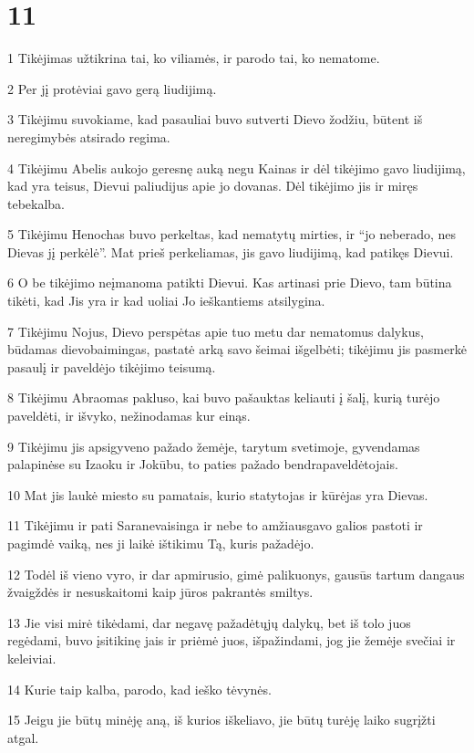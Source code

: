 \chapter{11}


\par 1 Tikėjimas užtikrina tai, ko viliamės, ir parodo tai, ko nematome. 
\par 2 Per jį protėviai gavo gerą liudijimą. 
\par 3 Tikėjimu suvokiame, kad pasauliai buvo sutverti Dievo žodžiu, būtent iš neregimybės atsirado regima. 
\par 4 Tikėjimu Abelis aukojo geresnę auką negu Kainas ir dėl tikėjimo gavo liudijimą, kad yra teisus, Dievui paliudijus apie jo dovanas. Dėl tikėjimo jis ir miręs tebekalba. 
\par 5 Tikėjimu Henochas buvo perkeltas, kad nematytų mirties, ir “jo neberado, nes Dievas jį perkėlė”. Mat prieš perkeliamas, jis gavo liudijimą, kad patikęs Dievui. 
\par 6 O be tikėjimo neįmanoma patikti Dievui. Kas artinasi prie Dievo, tam būtina tikėti, kad Jis yra ir kad uoliai Jo ieškantiems atsilygina. 
\par 7 Tikėjimu Nojus, Dievo perspėtas apie tuo metu dar nematomus dalykus, būdamas dievobaimingas, pastatė arką savo šeimai išgelbėti; tikėjimu jis pasmerkė pasaulį ir paveldėjo tikėjimo teisumą. 
\par 8 Tikėjimu Abraomas pakluso, kai buvo pašauktas keliauti į šalį, kurią turėjo paveldėti, ir išvyko, nežinodamas kur einąs. 
\par 9 Tikėjimu jis apsigyveno pažado žemėje, tarytum svetimoje, gyvendamas palapinėse su Izaoku ir Jokūbu, to paties pažado bendrapaveldėtojais. 
\par 10 Mat jis laukė miesto su pamatais, kurio statytojas ir kūrėjas yra Dievas. 
\par 11 Tikėjimu ir pati Sara­nevaisinga ir nebe to amžiaus­gavo galios pastoti ir pagimdė vaiką, nes ji laikė ištikimu Tą, kuris pažadėjo. 
\par 12 Todėl iš vieno vyro, ir dar apmirusio, gimė palikuonys, gausūs tartum dangaus žvaigždės ir nesuskaitomi kaip jūros pakrantės smiltys. 
\par 13 Jie visi mirė tikėdami, dar negavę pažadėtųjų dalykų, bet iš tolo juos regėdami, buvo įsitikinę jais ir priėmė juos, išpažindami, jog jie žemėje svečiai ir keleiviai. 
\par 14 Kurie taip kalba, parodo, kad ieško tėvynės. 
\par 15 Jeigu jie būtų minėję aną, iš kurios iškeliavo, jie būtų turėję laiko sugrįžti atgal. 
